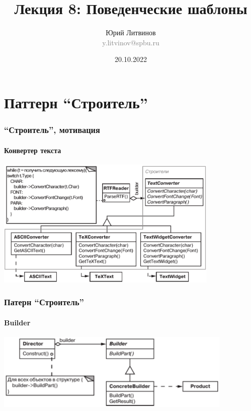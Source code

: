 \documentclass[xetex,mathserif,serif]{beamer}
\title[Шаблоны]{Лекция 8: Поведенческие шаблоны}
\author[Юрий Литвинов]{Юрий Литвинов\\\small{\textcolor{gray}{y.litvinov@spbu.ru}}}
\date{20.10.2022}
\begin{document}
    \begin{frame}[plain]
        \titlepage
    \end{frame}

    \section{Паттерн ``Строитель''}

    \begin{frame}
        \frametitle{``Строитель'', мотивация}
        \framesubtitle{Конвертер текста}
        \begin{center}
            \includegraphics[width=0.8\textwidth]{textConverter.png}
        \end{center}
    \end{frame}

    \begin{frame}
        \frametitle{Патерн ``Строитель''}
        \framesubtitle{Builder}
        \begin{center}
            \includegraphics[width=0.85\textwidth]{builder.png}
        \end{center}
    \end{frame}
    
\end{document}
